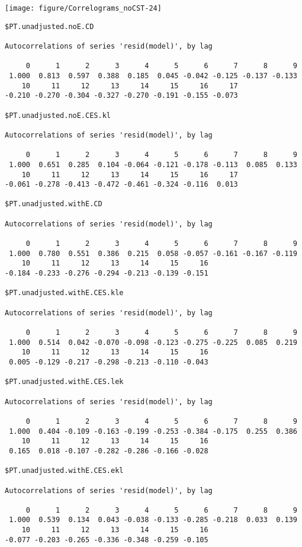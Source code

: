 \documentclass[preprint,authoryear,12pt]{elsarticle}\usepackage[]{graphicx}\usepackage[]{color}
\makeatletter
\def\maxwidth{ %
  \ifdim\Gin@nat@width>\linewidth
    \linewidth
  \else
    \Gin@nat@width
  \fi
}
\newenvironment{kframe}{%
 \def\at@end@of@kframe{}%
 \ifinner\ifhmode%
  \def\at@end@of@kframe{\end{minipage}}%
  \begin{minipage}{\columnwidth}%
 \fi\fi%
 \def\FrameCommand##1{\hskip\@totalleftmargin \hskip-\fboxsep
 \colorbox{shadecolor}{##1}\hskip-\fboxsep
     \hskip-\linewidth \hskip-\@totalleftmargin \hskip\columnwidth}%
 \MakeFramed {\advance\hsize-\width
   \@totalleftmargin\z@ \linewidth\hsize
   \@setminipage}}%
 {\par\unskip\endMakeFramed%
 \at@end@of@kframe}
\newenvironment{knitrout}{}{} %
\makeatother
\begin{document}
\begin{knitrout}
\texttt{[image: figure/Correlograms\_noCST-24]} 
\begin{kframe}\begin{verbatim}
$PT.unadjusted.noE.CD

Autocorrelations of series 'resid(model)', by lag

     0      1      2      3      4      5      6      7      8      9 
 1.000  0.813  0.597  0.388  0.185  0.045 -0.042 -0.125 -0.137 -0.133 
    10     11     12     13     14     15     16     17 
-0.210 -0.270 -0.304 -0.327 -0.270 -0.191 -0.155 -0.073 

$PT.unadjusted.noE.CES.kl

Autocorrelations of series 'resid(model)', by lag

     0      1      2      3      4      5      6      7      8      9 
 1.000  0.651  0.285  0.104 -0.064 -0.121 -0.178 -0.113  0.085  0.133 
    10     11     12     13     14     15     16     17 
-0.061 -0.278 -0.413 -0.472 -0.461 -0.324 -0.116  0.013 

$PT.unadjusted.withE.CD

Autocorrelations of series 'resid(model)', by lag

     0      1      2      3      4      5      6      7      8      9 
 1.000  0.780  0.551  0.386  0.215  0.058 -0.057 -0.161 -0.167 -0.119 
    10     11     12     13     14     15     16 
-0.184 -0.233 -0.276 -0.294 -0.213 -0.139 -0.151 

$PT.unadjusted.withE.CES.kle

Autocorrelations of series 'resid(model)', by lag

     0      1      2      3      4      5      6      7      8      9 
 1.000  0.514  0.042 -0.070 -0.098 -0.123 -0.275 -0.225  0.085  0.219 
    10     11     12     13     14     15     16 
 0.005 -0.129 -0.217 -0.298 -0.213 -0.110 -0.043 

$PT.unadjusted.withE.CES.lek

Autocorrelations of series 'resid(model)', by lag

     0      1      2      3      4      5      6      7      8      9 
 1.000  0.404 -0.109 -0.163 -0.199 -0.253 -0.384 -0.175  0.255  0.386 
    10     11     12     13     14     15     16 
 0.165  0.018 -0.107 -0.282 -0.286 -0.166 -0.028 

$PT.unadjusted.withE.CES.ekl

Autocorrelations of series 'resid(model)', by lag

     0      1      2      3      4      5      6      7      8      9 
 1.000  0.539  0.134  0.043 -0.038 -0.133 -0.285 -0.218  0.033  0.139 
    10     11     12     13     14     15     16 
-0.077 -0.203 -0.265 -0.336 -0.348 -0.259 -0.105 


\end{verbatim}
\end{kframe}
\end{knitrout}
\end{document}
